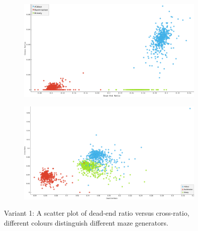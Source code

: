          \begin{figure}[!h]
            \centering
            \begin{subfigure}[!h]{0.47\textwidth}
                \includegraphics[scale = 0.17]{CrossVsDeadEnd_variant1.png}
               \caption{}
            \end{subfigure}
            \begin{subfigure}[!h]{0.47\textwidth}
                \includegraphics[scale = 0.17]{CrossVsDeadEnd_variant2.png}
               \caption{}
            \end{subfigure}
            \caption{Variant 1: A scatter plot of dead-end ratio versus cross-ratio, different colours distinguish different maze generators.}
            \end{figure}
\newpage

